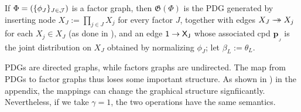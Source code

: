\documentclass{article}
\theoremstyle{plain}
\newtheorem{prop}[theorem]{Proposition}
\theoremstyle{definition}
\theoremstyle{remark}
\newcommand\mat[1]{\mathbf{#1}}
\newcommand{\commentout}[1]{\ignorespaces}
\newcommand{\tto}{%
	\rightarrow\mathrel{\mspace{-15mu}}\rightarrow}
\newcommand{\bp}[1][L]{\mat{p}_{\!_{#1}\!}}
\newcommand{\dg}[1]{\mathfrak{#1}}
\newcommand{\PDGof}[1]{\dg G(#1)}
\numberwithin{equation}{section}
\begin{document}
\begin{defn} \label{def:fg2PDG}
If $\Phi=(\{\phi_J\}_{J \in \cal J})$ is a factor graph, then 
$\PDGof{\Phi}$ is the PDG generated by inserting
node  $X_J := \prod_{j \in J} X_j$ for every factor $J$,
together with edges $X_J \tto X_j$ for each $X_j \in X_J$
(as done in ), and an edge $\sf 1 \to X_J$ whose
associated cpd $\bp[J]$ is the joint distribution on $X_J$ obtained by
normalizing $\phi_J$; let $\beta_L := \theta_L$.%
\end{defn}

PDGs are directed graphs, while factors graphs are undirected.  The
map from PDGs to factor graphs thus loses some important structure.
As shown in ) in the appendix,
the mappings can change the graphical structure signfiicantly.
Nevertheless, if we take $\gamma=1$,
the two operations have the same semantics.  

\commentout{
	\begin{prop}[restate=propfgpdglossless]%
		$\Phi \circ \PDGof = \mathrm{Id}_{\text{FG}}$. That is, if $F$ is a factor graph, then $\Pr_{\Phi(\PDGof{F})} = \Pr_F$.
	\end{prop}
}
\end{document}
